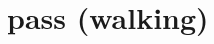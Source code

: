 \chapter{pass (walking)}

\begin{vocabulary}[pass]
\end{vocabulary}

\begin{vocabulary}[compass]
\end{vocabulary}